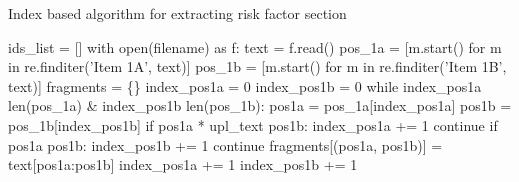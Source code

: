 \documentclass[12pt,MSc,a4paper,oneside]{muthesis}
\begin{document}
    \begin{algorithm}
      \caption{Index based algorithm for extracting risk factor section}
      \label{appendix:2}
      \begin{algorithmic}
        ids\_list = [] \newline
        with open(filename) as f: \newline
        text = f.read() \newline
        pos\_1a = [m.start() for m in re.finditer('Item 1A', text)] \newline
        pos\_1b = [m.start() for m in re.finditer('Item 1B', text)] \newline
        fragments = \{\} \newline
        index\_pos1a = 0 \newline
        index\_pos1b = 0 \newline
        while index\_pos1a \leq len(pos\_1a)   \&   index\_pos1b \leq len(pos\_1b): \newline
        pos1a = pos\_1a[index\_pos1a] \newline
        pos1b = pos\_1b[index\_pos1b] \newline
        if pos1a * upl\_text \leq pos1b: \newline
        index\_pos1a += 1 \newline
        continue \newline
        if pos1a \geq pos1b: \newline
        index\_pos1b += 1 \newline
        continue \newline
        fragments[(pos1a, pos1b)] = text[pos1a:pos1b] \newline
        index\_pos1a += 1 \newline
        index\_pos1b += 1 \newline
      \end{algorithmic}
    \end{algorithm}
\end{document}
